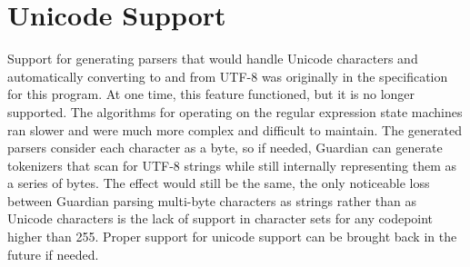 
\section{Unicode Support}
{
	Support for generating parsers that would
	handle Unicode characters and automatically
	converting to and from UTF-8 was originally in the
	specification for this program.
	At one time, this feature functioned, but it
	is no longer supported.
	The algorithms for operating on the regular expression
	state machines ran slower and were
	much more complex and difficult to maintain.
	The generated parsers consider each
	character as a byte, so if needed,
	Guardian can generate tokenizers that scan
	for UTF-8 strings while still internally representing them as a series
	of bytes. The effect would still be the same, the only noticeable loss
	between Guardian parsing multi-byte characters as strings rather than
	as Unicode characters is the lack of support in character sets
	for any codepoint higher than 255.
	Proper support for unicode support can be brought back in the
	future if needed.
}

